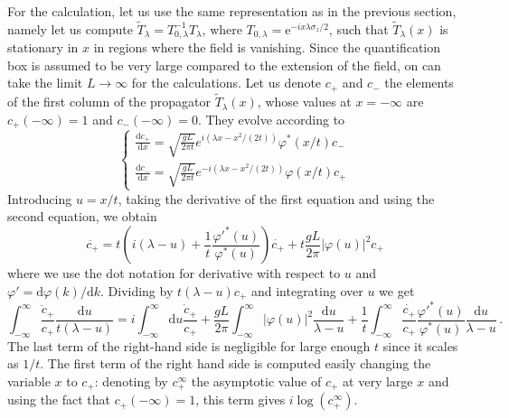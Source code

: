 \documentclass[submission,Phys,10pt]{SciPost}%
\newcommand{\comIsa}[1]{{\color{red}#1}}
\begin{document}
For the calculation, let us use the same representation as in the previous section, namely let us compute $\tilde{T}_\lambda=T_{0,\lambda}^{-1} T_\lambda$, where 
$T_{0,\lambda} = \mathrm{e}^{-i x \lambda \sigma_{z}/2}$, such that  $\tilde{T}_\lambda(x)$ is stationary in $x$ in regions where the field is vanishing. Since the quantification box is assumed to be very large compared to the extension of the field, on can take the limit $L\rightarrow\infty$ for the calculations. 
Let us denote $c_+$ and $c_-$ the elements of the first column of the propagator $\tilde{T}_\lambda(x)$, whose values at $x=-\infty$ are $c_+(-\infty)=1$ and $c_-(-\infty)=0$.  They evolve according to 
 \begin{equation}
     \left \{ 
     \begin{array}{l}
     \frac{\mathrm{d}c_+}{\mathrm{d}x}= \sqrt{\frac{gL}{2\pi t}}e^{i(\lambda x - x^2/(2t))}\varphi^*(x/t) c_-\\
     \frac{\mathrm{d} c_-}{\mathrm{d}x}= \sqrt{\frac{gL}{2\pi t}}e^{-i(\lambda x - x^2/(2t))}\varphi(x/t) c_+
     \end{array} \right . 
 \end{equation}
 Introducing  $u=x/t$, taking the derivative of the first equation and using the second equation, we obtain 
 \begin{equation}
     \ddot{c_+}= t \left ( i(\lambda- u) + \frac{1}{t} \frac{\varphi'^*(u)}{\varphi^*(u)}\right ) \dot{c_+} + t \frac{gL}{2\pi } |\varphi(u)|^2 c_+
 \end{equation}
 where   we use the dot notation for derivative with respect to $u$ and $\varphi'= \mathrm{d}\varphi(k)/ \mathrm{d} k$.
Dividing  by $t(\lambda  -u)c_+$ and integrating 
over $u$ we get 
\begin{equation}
\label{eq:equadiffcpp}
    \int_{- \infty}^{\infty} \frac{\ddot c_+}{c_+} \frac{\mathrm{d}u}{t(\lambda  -u) } = i \int_{-\infty}^{\infty} \mathrm{d}u\frac{\dot{c}_+}{c_+} + \frac{gL}{2\pi} \int_{-\infty}^{\infty} |\varphi(u) |^{2} \frac{\mathrm{d}u}{\lambda  -u} + \frac{1}{t} \int_{- \infty}^{\infty}  \frac{\dot{c_+}}{c_+} \frac{\varphi'^{*}(u) }{\varphi^{ *}(u) } \frac{\mathrm{d}u}{\lambda  -u} \, .
\end{equation}
The last term of the right-hand side is negligible for large enough $t$ 
since it scales as $1/t$. %
The first term of the right hand side is computed easily changing the variable $x$ to $c_+$: denoting \comIsa{by} $c_+^\infty$ the asymptotic value of $c_+$ at very large $x$ and using the fact that $c_+(-\infty)=1$, this term gives $i\log(c_+^\infty)$. 
\end{document}
